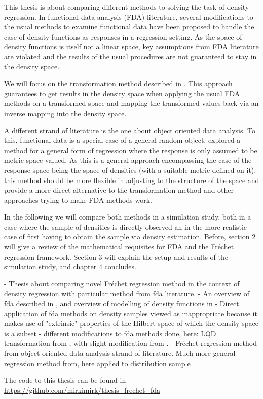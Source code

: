 This thesis is about comparing different methods to solving the task of density
regression. In functional data analysis (FDA) literature, several modifications to
the usual methods to examine functional data have been proposed to handle the case of
density functions as responses in a regression setting. As the space of density functions is itself
not a linear space, key assumptions from FDA literature are violated and the results
of the usual procedures are not guaranteed to stay in the density space.

We will focus on the transformation method described in \textcite{PetersenMüller2016}.
This approach guarantees to get results in the density space when applying the usual
FDA methods on a transformed space and mapping the transformed values back via an
inverse mapping into the density space.

A different strand of literature is the one about object oriented data analysis. To this,
functional data is a special case of a general random object. \textcite{PetersenMüller2019}
explored a method for a general form of regression where the response is only assumed to
be metric space-valued. As this is a general approach encompassing the case of the
response space being the space of densities (with a suitable metric defined on it),
this method should be more flexible in adjusting to the structure of the space and
provide a more direct alternative to the transformation method and other approaches
trying to make FDA methods work.

In the following we will compare both methods in a simulation study, both in a case
where the sample of densities is directly observed an in the more realistic case of
first having to obtain the sample via density estimation. Before, section 2 will give
a review of the mathematical requisites for FDA and the Fréchet regression framework.
Section 3 will explain the setup and results of the simulation study, and chapter 4
concludes.

- Thesis about comparing novel Fréchet regression method in the context of density regression
with particular method from fda literature.
- An overview of fda described in \textcite{WangChiouMüller2016}, and overview of modelling
of density functions in \textcite{PetersenZhangKokoszka2022}
- Direct application of fda methods on density samples viewed as inappropriate because
it makes use of "extrinsic" properties of the Hilbert space of which the density space is
a subset
- different modifications to fda methods done, here: LQD transformation from \textcite{PetersenMüller2016},
with slight modification from \textcite{KokoszkaEtAl2019}.
- Fréchet regression method \textcite{PetersenMüller2019} from object oriented data analysis strand of literature.
Much more general regression method from, here applied to distribution sample


\citet{HorvathKokoszka2012}
\citet{HallHorowitz2007}
\citet{PetersenMüller2019}
\citet{VanDerVaartWellner1996}
\citet{Bosq2000}
\citet{HastiTibshiraniFriedman2009}
\citet{Boor2001}

The code to this thesis can be found in \url{https://github.com/mirkimirk/thesis_frechet_fda}